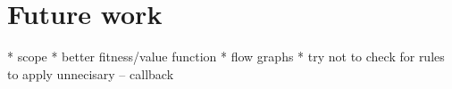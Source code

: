
\section{Future work}

* scope
* better fitness/value function
* flow graphs
* try not to check for rules to apply unnecisary -- callback
